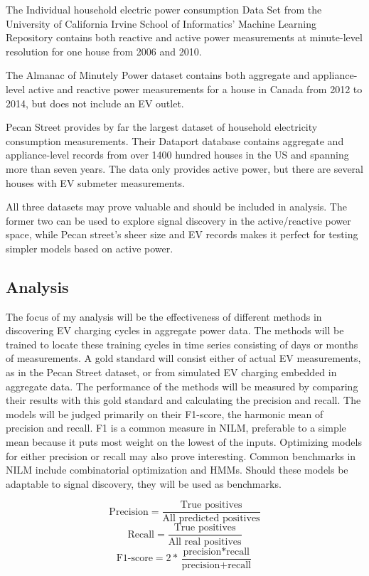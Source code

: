 \documentclass[12pt, american]{article}
\begin{document}
The Individual household electric power consumption Data Set from the University of California Irvine School of Informatics' Machine Learning Repository\cite{Dheeru2017} contains both reactive and active power measurements at minute-level resolution for one house from 2006 and 2010. 

The Almanac of Minutely Power dataset\cite{Makonin2016} contains both aggregate and appliance-level active and reactive power measurements for a house in Canada from 2012 to 2014, but does not include an EV outlet.

Pecan Street provides by far the largest dataset of household electricity consumption measurements. Their Dataport database contains aggregate and appliance-level records from over 1400 hundred houses in the US and spanning more than seven years\cite{Pecan2018}. The data only provides active power, but there are several houses with EV submeter measurements.

All three datasets may prove valuable and should be included in analysis. The former two can be used to explore signal discovery in the active/reactive power space, while Pecan street's sheer size and EV records makes it perfect for testing simpler models based on active power.

\subsection{Analysis}
The focus of my analysis will be the effectiveness of different methods in discovering EV charging cycles in aggregate power data. The methods will be trained to locate these training cycles in time series consisting of days or months of measurements. A gold standard will consist either of actual EV measurements, as in the Pecan Street dataset, or from simulated EV charging embedded in aggregate data. The performance of the methods will be measured by comparing their results with this gold standard and calculating the precision and recall. The models will be judged primarily on their F1-score, the harmonic mean of precision and recall. F1 is a common measure in NILM, preferable to a simple mean because it puts most weight on the lowest of the inputs. Optimizing models for either precision or recall may also prove interesting. Common benchmarks in NILM include combinatorial optimization and HMMs. Should these models be adaptable to signal discovery, they will be used as benchmarks.

\begin{equation}
\label{eq:precision}
\text{Precision} = \frac{\text{True positives}}{\text{All predicted positives}}
\end{equation}
\begin{equation}
\label{eq:recall}
\text{Recall} = \frac{\text{True positives}}{\text{All real positives}}
\end{equation}
\begin{equation}
\label{eq:F1}
\text{F1-score} = 2*\frac{\text{precision}*\text{recall}}{\text{precision}+\text{recall}}
\end{equation}
\end{document}
